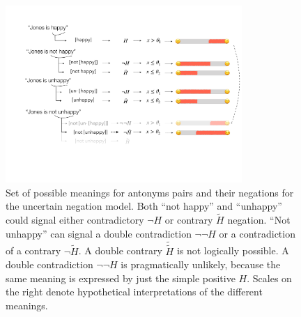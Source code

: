 \documentclass[floatsintext,doc]{apa6}
\begin{document}
\begin{figure}[h]
\centering \includegraphics[width=0.8\textwidth]{figs/schematicMeanings}  
\caption{Set of possible meanings for antonyms pairs and their negations for the uncertain negation model. 
Both ``not happy'' and ``unhappy'' could signal either contradictory $\neg H$ or contrary $\tilde{H}$ negation.
``Not unhappy'' can signal a double contradiction  $\neg \neg H$  or a contradiction of a contrary  $ \neg \tilde{H}$. A double contrary $\tilde{\tilde{H}}$ is not logically possible. A double contradiction  $\neg \neg H$  is pragmatically unlikely, because the same meaning is expressed by just the simple positive $H$. Scales on the right denote hypothetical interpretations of the different meanings.}
\label{fig:meanings}
\end{figure}

\end{document}
